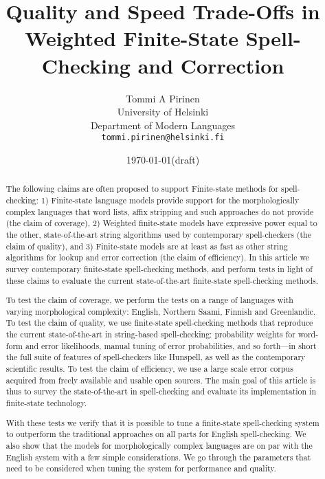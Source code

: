 \documentclass[a4paper,12pt]{article}
\title{Quality and Speed Trade-Offs in
    Weighted Finite-State Spell-Checking and Correction}
\author{Tommi A Pirinen\\
 [0.5cm] University of Helsinki\\ %
 Department of Modern Languages\\ %
 \texttt{tommi.pirinen@helsinki.fi}}   %
\date{\today (draft)}
\begin{document}
\maketitle
\thispagestyle{empty}

\begin{abstract} \noindent The following claims are often proposed to support
    Finite-state methods for spell-checking: 1) Finite-state language models
    provide support for the morphologically complex languages that word lists,
    affix stripping and such approaches do not provide (the claim of coverage),
    2) Weighted finite-state models have expressive power equal to the other,
    state-of-the-art string algorithms used by contemporary spell-checkers (the
    claim of quality), and 3) Finite-state models are at least as fast as other
    string algorithms for lookup and error correction (the claim of
    efficiency).  In this article we survey contemporary finite-state
    spell-checking methods, and perform tests in light of these claims to
    evaluate the current state-of-the-art finite-state spell-checking methods.

    To test the claim of coverage, we perform the tests on a range of languages
    with varying morphological complexity: English, Northern Saami, Finnish and
    Greenlandic.  To test the claim of quality, we use finite-state
    spell-checking methods that reproduce the current state-of-the-art in
    string-based spell-checking: probability weights for word-form and error
    likelihoods, manual tuning of error probabilities, and so forth---in short
    the full suite of features of spell-checkers like Hunspell, as well as the
    contemporary scientific results. To test the claim of efficiency, we use a
    large scale error corpus acquired from freely available and usable open
    sources. The main goal of this article is thus to survey the
    state-of-the-art in spell-checking and evaluate its implementation in
    finite-state technology.  

    With these tests we verify that it is possible to tune a finite-state
    spell-checking system to outperform the traditional approaches on all parts
    for English spell-checking. We also show that the models for
    morphologically complex languages are on par with the English system with a
    few simple considerations. We go through the parameters that need to
    be considered when tuning the system for performance and quality.

\end{abstract}
\end{document}

